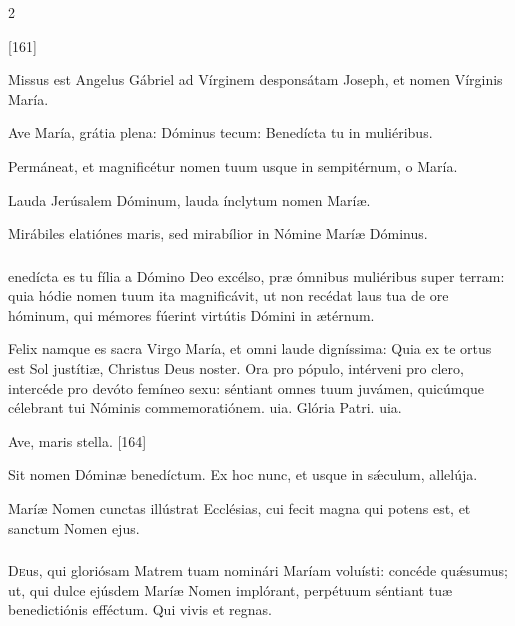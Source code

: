 \documentclass[9pt,twoside]{extarticle}
\begin{document}
\begin{multicols}{2}
\begin{tightlist}{}
\item {} [161]
\item {} Missus est Angelus Gábriel ad Vírginem desponsátam Joseph, et nomen Vírginis María.
\item {} Ave María, grátia plena: Dóminus tecum: Benedícta tu in muliéribus.
\item {} Permáneat, et magnificétur nomen tuum usque in sempitérnum, o María.
\item {} Lauda Jerúsalem Dóminum, lauda ínclytum nomen Maríæ.
\item {} Mirábiles elatiónes maris, sed mirabílior in Nómine Maríæ Dóminus. 
\end{tightlist}

\subsubsection*{}
enedícta es tu fília a Dómino Deo excélso, præ ómnibus muliéribus super terram: quia hódie nomen tuum ita magnificávit, ut non recédat laus tua de ore hóminum, qui mémores fúerint virtútis Dómini in ætérnum.

\begin{tightlist}{}
\item {} Felix namque es sacra Virgo María, et omni laude digníssima: \textred{*} Quia ex te ortus est Sol justítiæ, Christus Deus noster.
 Ora pro pópulo, intérveni pro clero, intercéde pro devóto femíneo sexu: séntiant omnes tuum juvámen, quicúmque célebrant tui Nóminis commemoratiónem. uia. Glória Patri. uia.
\item {} Ave, maris stella. [164]
\item {} Sit nomen Dóminæ benedíctum.  Ex hoc nunc, et usque in sǽculum, allelúja.
\item {} Maríæ Nomen cunctas illústrat Ecclésias, cui fecit magna qui potens est, et sanctum Nomen ejus.
\end{tightlist}

\subsubsection*{\center {}}
\lettrine{D}eus, qui gloriósam Matrem tuam nominári Maríam voluísti: concéde quǽsumus; ut, qui dulce ejúsdem Maríæ Nomen implórant, perpétuum séntiant tuæ benedictiónis efféctum. Qui vivis et regnas.


\end{multicols}
\end{document}
